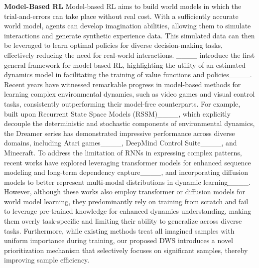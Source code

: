 \noindent \textbf{Model-Based RL}
Model-based RL aims to build world models in which the trial-and-errors can take place without real cost. With a sufficiently accurate world model, agents can develop imagination abilities, allowing them to simulate interactions and generate synthetic experience data. This simulated data can then be leveraged to learn optimal policies for diverse decision-making tasks, effectively reducing the need for real-world interactions. ____ introduce the first general framework for model-based RL, highlighting the utility of an estimated dynamics model in facilitating the training of value functions and policies____. Recent years have witnessed remarkable progress in model-based methods for learning complex environmental dynamics, such as video games and visual control tasks, consistently outperforming their model-free counterparts. For example, built upon Recurrent State Space Models (RSSM)____, which explicitly decouple the deterministic and stochastic components of environmental dynamics, the Dreamer series has demonstrated impressive performance across diverse domains, including Atari games____, DeepMind Control Suite____, and Minecraft. 
To address the limitation of RNNs in expressing complex patterns, recent works have explored leveraging transformer models for enhanced sequence modeling and long-term dependency capture____, and incorporating diffusion models to better represent multi-modal distributions in dynamic learning____. However, although these works also employ transformer or diffusion models for world model learning, they predominantly rely on training from scratch and fail to leverage pre-trained knowledge for enhanced dynamics understanding, making them overly task-specific and limiting their ability to generalize across diverse tasks. Furthermore, while existing methods treat all imagined samples with uniform importance during training, our proposed DWS introduces a novel prioritization mechanism that selectively focuses on significant samples, thereby improving sample efficiency. 
\vspace{-0.5em}